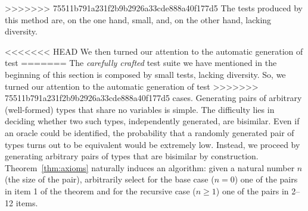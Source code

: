 >>>>>>> 75511b791a231f2b9b2926a33cde888a40f177d5
The tests produced by this method are, on the one hand, small, and, on
the other hand, lacking diversity.

<<<<<<< HEAD
We then turned our attention to the automatic generation of test
=======
The \emph{carefully crafted} test suite we have mentioned in the beginning
of this section is composed by small tests, lacking diversity.
So, we turned our attention to the automatic generation of test
>>>>>>> 75511b791a231f2b9b2926a33cde888a40f177d5
cases. Generating pairs of arbitrary (well-formed) types that share no
variables is simple. The difficulty lies in deciding whether two such
types, independently generated, are bisimilar. Even if an oracle could
be identified, the probability that a randomly generated pair of types
turns out to be equivalent would be extremely low. Instead, we proceed
by generating arbitrary pairs of types that are bisimilar by
construction. Theorem~\ref{thm:axioms} naturally induces an algorithm:
given a natural number $n$ (the size of the pair), arbitrarily select
for the base case ($n=0$) one of the pairs in item 1 of the theorem
and for the recursive case ($n\ge1$) one of the pairs in 2--12 items.


